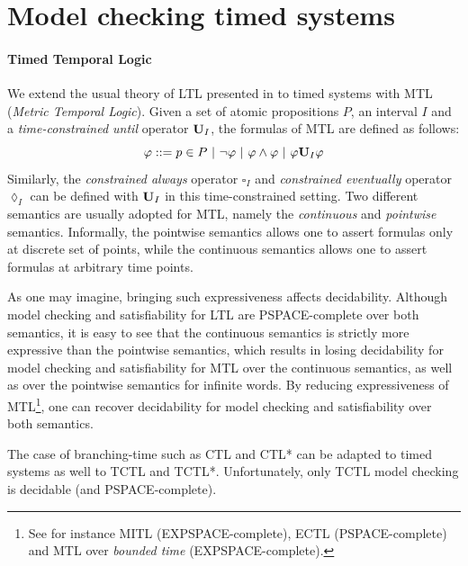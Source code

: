 \documentclass[11pt]{article}
\theoremstyle{definition}
\theoremstyle{remark}
\theoremstyle{definition}
\begin{document}
\section{Model checking timed systems}\label{sec:app}
\paragraph{Timed Temporal Logic}\label{par:timedlogic} We extend the usual theory of LTL presented in \cite[Chapter~2]{handbook} to timed systems with MTL (\emph{Metric Temporal Logic}).
Given a set of atomic propositions $P$, an interval $I$ and a \emph{time-constrained until} operator $\text{\bf U}_I$, the formulas of MTL are defined as follows:
\begin{equation*}
	\varphi ::= p \in P\ |\ \neg \varphi\ |\ \varphi \land \varphi\ |\ \varphi \text{\bf U}_I \varphi
\end{equation*}
Similarly, the \emph{constrained always} operator $\square_I$ and \emph{constrained eventually} operator $\lozenge_I$ can be defined with $\text{\bf U}_I$ in this time-constrained setting. Two different semantics are usually adopted for MTL, namely the \emph{continuous} and \emph{pointwise} semantics. Informally, the pointwise semantics allows one to assert formulas only at discrete set of points, while the continuous semantics allows one to assert formulas at arbitrary time points.

As one may imagine, bringing such expressiveness affects decidability. Although model checking and satisfiability for LTL are PSPACE-complete over both semantics, it is easy to see that the continuous semantics is strictly more expressive than the pointwise semantics, which results in losing decidability for model checking and satisfiability for MTL over the continuous semantics, as well as over the pointwise semantics for infinite words. By reducing expressiveness of MTL\footnote{See for instance MITL (EXPSPACE-complete), ECTL (PSPACE-complete) and MTL over \emph{bounded time} (EXPSPACE-complete).}, one can recover decidability for model checking and satisfiability over both semantics.

The case of branching-time such as CTL and CTL* can be adapted to timed systems as well to TCTL and TCTL*. Unfortunately, only TCTL model checking is decidable (and PSPACE-complete).
\end{document}
